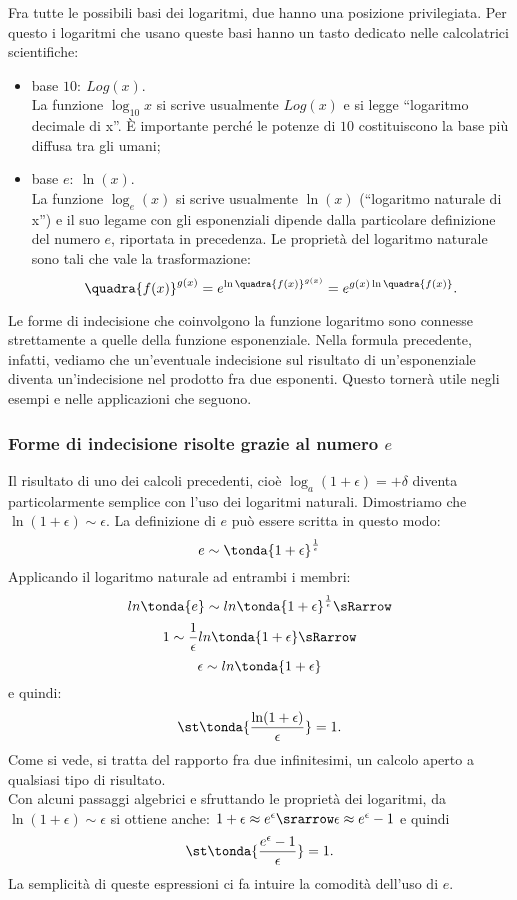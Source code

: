 \begin{osservazione}
 Fra tutte le possibili basi dei logaritmi, due hanno una posizione 
privilegiata. 
 Per questo i logaritmi che usano queste basi hanno un tasto dedicato nelle 
 calcolatrici scientifiche:
 \begin{itemize} [noitemsep]
 \item 
base $10:\ Log(x)$.\\
La funzione $\log_{10}{x}$ si scrive usualmente $Log(x)$ e si legge 
``logaritmo decimale di x''. È importante perché le potenze di $10$ 
costituiscono la base più diffusa tra gli umani;
 \item
base $e:\ \ln(x)$.\\
La funzione $\log_e(x)$ si scrive usualmente $\ln(x)$ (``logaritmo naturale 
di x'')
e il suo legame con gli esponenziali dipende dalla particolare definizione
del numero $e$, riportata in precedenza. Le proprietà del logaritmo naturale 
sono tali che vale la trasformazione:
\[
 \quadra{f(x)}^{g(x)}=e^{\ln\quadra{f(x)}^{g(x)}}=e^{g(x)\ln\quadra{f(x)}}.
\]
 \end{itemize}
\end{osservazione}

\begin{osservazione}
Le forme di indecisione che coinvolgono la funzione logaritmo sono
connesse strettamente a quelle della funzione esponenziale. Nella formula 
precedente, infatti, vediamo che un'eventuale indecisione sul risultato di
un'esponenziale diventa un'indecisione nel prodotto fra due esponenti.
Questo tornerà utile negli esempi e nelle applicazioni che seguono.
\end{osservazione}

\subsubsection{Forme di indecisione risolte grazie al numero $e$}
\label{subsubsec:insnum_ind_e}
Il risultato di uno dei calcoli precedenti, cioè 
$\log_a (1+\epsilon)=+\delta$ diventa particolarmente semplice 
con l'uso dei logaritmi naturali. 
Dimostriamo che $\ln(1+\epsilon) \sim \epsilon$. 
La definizione di \(e\) può essere scritta in questo modo:
\[e \sim \tonda{1 + \epsilon}^\frac{1}{\epsilon}\]
Applicando il logaritmo naturale ad entrambi i membri:
\[ln{\tonda{e}} \sim ln{\tonda{1 + \epsilon}^\frac{1}{\epsilon}} \sRarrow\]
\[1 \sim \frac{1}{\epsilon} ln{\tonda{1 + \epsilon}} \sRarrow\]
\[\epsilon \sim ln{\tonda{1 + \epsilon}}\]
e quindi:
\[
\st\tonda{\frac{\ln(1+\epsilon)}{\epsilon}}=1.
\]
Come si vede, si tratta del rapporto fra due infinitesimi, un
calcolo aperto a qualsiasi tipo di risultato.\\
Con alcuni passaggi algebrici e sfruttando le proprietà dei 
logaritmi, da $\ln(1+\epsilon) \sim \epsilon$ si ottiene anche:
$1+\epsilon\approx e^\epsilon \srarrow \epsilon\approx e^\epsilon-1$ 
e quindi
\[
\st\tonda{\frac{e^\epsilon-1}{\epsilon}}=1.
\]
La semplicità di queste espressioni ci fa intuire la comodità dell'uso di $e$.

